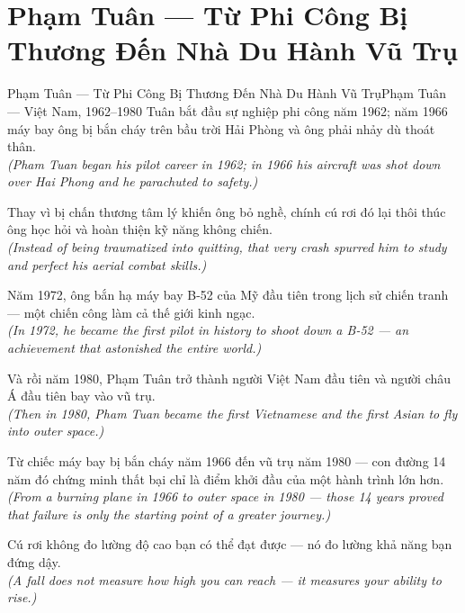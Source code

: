\section{Phạm Tuân --- Từ Phi Công Bị Thương Đến Nhà Du Hành Vũ Trụ}
\begin{truyen}{Phạm Tuân --- Từ Phi Công Bị Thương Đến Nhà Du Hành Vũ Trụ}{Phạm Tuân --- Việt Nam, 1962--1980}
 Tuân bắt đầu sự nghiệp phi công năm 1962; năm 1966 máy bay ông bị bắn cháy trên bầu trời Hải Phòng và ông phải nhảy dù thoát thân.\\[4pt]
\textit{(Pham Tuan began his pilot career in 1962; in 1966 his aircraft was shot down over Hai Phong and he parachuted to safety.)}

Thay vì bị chấn thương tâm lý khiến ông bỏ nghề, chính cú rơi đó lại thôi thúc ông học hỏi và hoàn thiện kỹ năng không chiến.\\[4pt]
\textit{(Instead of being traumatized into quitting, that very crash spurred him to study and perfect his aerial combat skills.)}

Năm 1972, ông bắn hạ máy bay B-52 của Mỹ đầu tiên trong lịch sử chiến tranh --- một chiến công làm cả thế giới kinh ngạc.\\[4pt]
\textit{(In 1972, he became the first pilot in history to shoot down a B-52 --- an achievement that astonished the entire world.)}

Và rồi năm 1980, Phạm Tuân trở thành người Việt Nam đầu tiên và người châu Á đầu tiên bay vào vũ trụ.\\[4pt]
\textit{(Then in 1980, Pham Tuan became the first Vietnamese and the first Asian to fly into outer space.)}

Từ chiếc máy bay bị bắn cháy năm 1966 đến vũ trụ năm 1980 --- con đường 14 năm đó chứng minh thất bại chỉ là điểm khởi đầu của một hành trình lớn hơn.\\[4pt]
\textit{(From a burning plane in 1966 to outer space in 1980 --- those 14 years proved that failure is only the starting point of a greater journey.)}

\end{truyen}
\begin{baihoc}
  Cú rơi không đo lường độ cao bạn có thể đạt được --- nó đo lường khả năng bạn đứng dậy.\\[4pt]
  \textit{(A fall does not measure how high you can reach --- it measures your ability to rise.)}
\end{baihoc}

